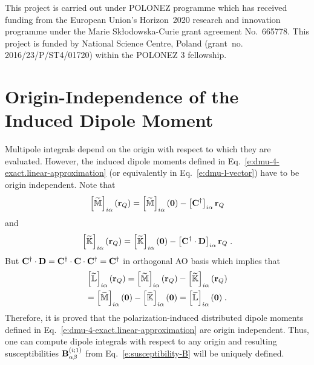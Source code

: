\documentclass[aip,amsmath,amssymb,reprint,floatfix]{revtex4-1}
\begin{document}
\begin{acknowledgments}
This project is carried out under POLONEZ programme which has received funding from the European Union's
Horizon~2020 research and innovation programme under the Marie Skłodowska-Curie grant agreement 
No.~665778. This project is funded by National Science Centre, Poland 
(grant~no. 2016/23/P/ST4/01720) within the POLONEZ 3 fellowship.
\end{acknowledgments}

%
\appendix

\section{\label{a:orig-dep} Origin-Independence of the Induced Dipole Moment}

Multipole integrals depend on the origin with respect to which they are evaluated.
However, the induced dipole moments defined in Eq.~\eqref{e:dmu-4-exact.linear-approximation} 
(or equivalently in Eq.~\eqref{e:dmu-l-vector})
have to be origin independent. Note that
%
\begin{equation}
 \left[ \widetilde{\mathbb{M}} \right]_{i\alpha} ({\bf r}_Q) 
 = \left[ \widetilde{\mathbb{M}} \right]_{i\alpha} ({\bf 0}) - \left[ {\bf C}^\dagger \right]_{i\alpha} {\bf r}_Q  
\end{equation}
%
and
%
\begin{equation}
 \left[ \widetilde{\mathbb{K}} \right]_{i\alpha} ({\bf r}_Q) 
 = \left[ \widetilde{\mathbb{K}} \right]_{i\alpha} ({\bf 0}) - \left[ {\bf C}^\dagger \cdot {\bf D} \right]_{i\alpha} {\bf r}_Q \;.
\end{equation}
%
But ${\bf C}^\dagger \cdot {\bf D}={\bf C}^\dagger \cdot {\bf C} \cdot {\bf C}^\dagger={\bf C}^\dagger$ in orthogonal
AO basis which implies that
%
\begin{multline}
   \left[ \widetilde{\mathbb{L}} \right]_{i\alpha} ({\bf r}_Q) 
 = \left[ \widetilde{\mathbb{M}} \right]_{i\alpha} ({\bf r}_Q) 
 - \left[ \widetilde{\mathbb{K}} \right]_{i\alpha} ({\bf r}_Q) \\
 = \left[ \widetilde{\mathbb{M}} \right]_{i\alpha} ({\bf 0})   
 - \left[ \widetilde{\mathbb{K}} \right]_{i\alpha} ({\bf 0})
 = \left[ \widetilde{\mathbb{L}} \right]_{i\alpha} ({\bf 0}) \;.
\end{multline}
%
Therefore, it is proved that the polarization\hyp{}induced distributed dipole moments 
defined in Eq.~\eqref{e:dmu-4-exact.linear-approximation} are origin independent.
Thus, one can compute dipole integrals with respect to any origin and resulting
susceptibilities ${\bf B}_{\alpha\beta}^{(i;1)}$ from Eq.~\eqref{e:susceptibility-B} will be uniquely defined.
\end{document}
